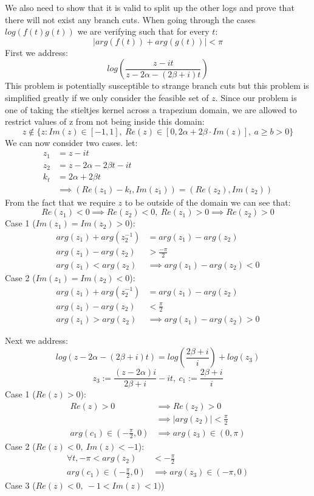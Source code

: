 \documentclass{article}
\begin{document}
We also need to show that it is valid to split up the other logs and prove that there will not exist any branch cuts.
When going through the cases $log(f(t)g(t))$ we are verifying such that for every $t$:
$$|arg(f(t))+arg(g(t))|<\pi$$
First we address:
$$log(\frac{z-it}{z-2\alpha-(2\beta+i)t})$$
This problem is potentially susceptible to strange branch cuts but this problem is simplified greatly if we only consider the feasible set of $z$.
Since our problem is one of taking the stieltjes kernel across a trapezium domain, we are allowed to restrict values of z from not being inside this domain:
$$z\notin \{z: Im(z)\in [-1,1],\:Re(z)\in [0,2\alpha+2\beta\cdot Im(z)],\:a\geq b>0\}$$
We can now consider two cases.
let:
\begin{align}
    z_1&=z-it\\
    z_2&=z-2\alpha-2\beta t-it\\
    k_t&=2\alpha+2\beta t\\
    &\implies (Re(z_1)-k_t, Im(z_1))=(Re(z_2), Im(z_2))
\end{align}
From the fact that we require $z$ to be outside of the domain we can see that:
$$Re(z_1)<0 \implies Re(z_2)<0,\: Re(z_1)>0 \implies Re(z_2)>0$$
Case 1 ($Im(z_1)=Im(z_2)>0$):
\begin{align}
    arg(z_1)+arg(z_2^{-1})&=arg(z_1)-arg(z_2)\\
    arg(z_1)-arg(z_2)&>\frac{-\pi}{2}\\
    arg(z_1)<arg(z_2)&\implies arg(z_1)-arg(z_2)<0
\end{align}
Case 2 ($Im(z_1)=Im(z_2)<0$):
\begin{align}
    arg(z_1)+arg(z_2^{-1})&=arg(z_1)-arg(z_2)\\
    arg(z_1)-arg(z_2)&<\frac{\pi}{2}\\
    arg(z_1)>arg(z_2)&\implies arg(z_1)-arg(z_2)>0
\end{align}

Next we address:
$$log(z-2\alpha-(2\beta+i)t)=log(\frac{2\beta+i}{i})+log(z_3)$$
$$z_3:=\frac{(z-2\alpha)i}{2\beta+i}-it,\:c_1:=\frac{2\beta+i}{i}$$
Case 1 ($Re(z)>0$):
\begin{align}
    Re(z)>0&\implies Re(z_2)>0\\
    &\implies |arg(z_2)|<\frac{\pi}{2}\\
    arg(c_1)\in(-\frac{\pi}{2},0)&\implies arg(z_3)\in(0,\pi)
\end{align}
Case 2 ($Re(z)<0,\:Im(z)<-1$):
\begin{align}
    \forall t, -\pi<arg(z_2)&<-\frac{\pi}{2}\\
    arg(c_1)\in(-\frac{\pi}{2},0)&\implies arg(z_3)\in(-\pi,0)
\end{align}
Case 3 ($Re(z)<0,\:-1<Im(z)<1)$)
\end{document}

